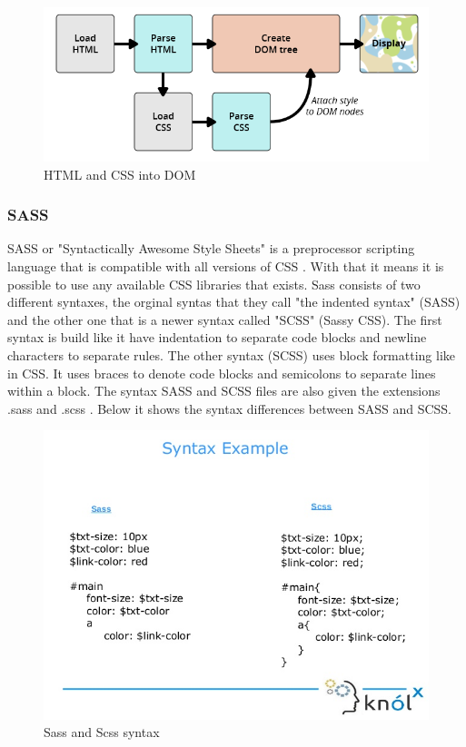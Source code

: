 \begin{figure}[h]
    \centering
    \includegraphics[width=130mm]{figures/DOM.png}
    \caption{HTML and CSS into DOM}
    \label{fig:DOM}
\end{figure}
\clearpage

\subsubsection{SASS}
SASS or "Syntactically Awesome Style Sheets" is a preprocessor scripting language that is compatible with all versions of CSS \cite{Sass_1}. 
With that it means it is possible to use any available CSS libraries that exists. Sass consists of two different syntaxes, the orginal syntas that they call "the indented syntax" (SASS) and the other one that is a newer syntax called "SCSS" (Sassy CSS)\cite{Sass_2}. 
The first syntax is build like it have indentation to separate code blocks and newline characters to separate rules. The other syntax (SCSS) uses block formatting like in CSS. It uses braces to denote code blocks and semicolons to separate lines within a block. The syntax SASS and SCSS files are also given the extensions .sass and .scss \cite{Sass_2}. 
Below it shows the syntax differences between SASS and SCSS. 

\begin{figure}[h]
    \centering
     \includegraphics[width=115mm,scale=1]{figures/sass_and_scss.png}
    \caption{Sass and Scss syntax}
    \label{fig:Sass}
\end{figure}


